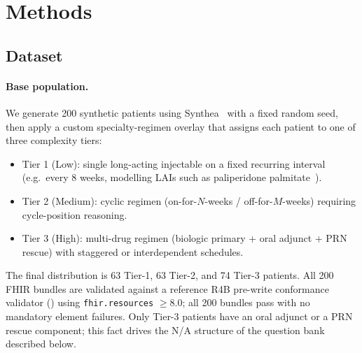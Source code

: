 \section{Methods}
\label{sec:methods}

\subsection{Dataset}
\label{sec:methods:dataset}

\paragraph{Base population.}
We generate 200 synthetic patients using Synthea~\citep{walonoski2018synthea}
with a fixed random seed, then apply a custom specialty-regimen overlay that assigns each
patient to one of three complexity tiers:
\begin{itemize}
  \item Tier 1 (Low): single long-acting injectable on a fixed recurring interval
    (e.g.\ every 8 weeks, modelling LAIs such as paliperidone palmitate~\citep{correll2024pp6m}).
  \item Tier 2 (Medium): cyclic regimen (on-for-$N$-weeks / off-for-$M$-weeks)
    requiring cycle-position reasoning.
  \item Tier 3 (High): multi-drug regimen (biologic primary + oral adjunct + PRN
    rescue) with staggered or interdependent schedules.
\end{itemize}
The final distribution is 63 Tier-1, 63 Tier-2, and 74 Tier-3 patients.  All 200 FHIR bundles
are validated against a reference R4B pre-write conformance validator
() using \texttt{fhir.resources} $\geq$8.0; all
200 bundles pass with no mandatory element failures.  Only Tier-3 patients have an oral
adjunct or a PRN rescue component; this fact drives the N/A structure of the question bank
described below.


